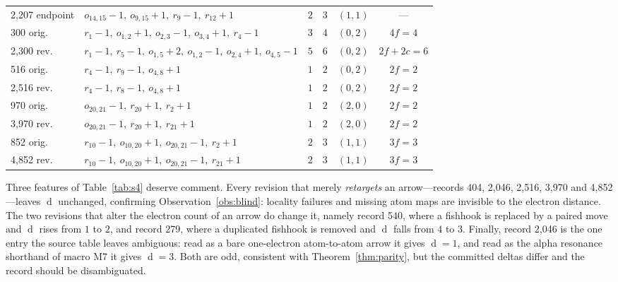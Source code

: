 \documentclass[11pt]{article}
\numberwithin{equation}{section}
\newcommand{\del}{\operatorname{d}}
\theoremstyle{plain}
\theoremstyle{definition}
\theoremstyle{remark}
\begin{document}
\begin{longtable}{@{}l >{\raggedright\arraybackslash}p{6.3cm} c c c c@{}}
2{,}207 endpoint
  & $o_{14,15}{-}1,\ o_{9,15}{+}1,\ r_9{-}1,\ r_{12}{+}1$ & $2$ & $3$ & $(1,1)$ & --- \\
\addlinespace[2pt]
2{,}300 orig.
  & $r_1{-}1,\ o_{1,2}{+}1,\ o_{2,3}{-}1,\ o_{3,4}{+}1,\ r_4{-}1$ & $3$ & $4$ & $(0,2)$ & $4f=4$ \\
2{,}300 rev.
  & $r_1{-}1,\ r_5{-}1,\ o_{1,5}{+}2,\ o_{1,2}{-}1,\ o_{2,4}{+}1,\ o_{4,5}{-}1$
  & $5$ & $6$ & $(0,2)$ & $2f{+}2c=6$ \\
\addlinespace[2pt]
2{,}516 orig.
  & $r_4{-}1,\ r_9{-}1,\ o_{4,8}{+}1$ & $1$ & $2$ & $(0,2)$ & $2f=2$ \\
2{,}516 rev.
  & $r_4{-}1,\ r_8{-}1,\ o_{4,8}{+}1$ & $1$ & $2$ & $(0,2)$ & $2f=2$ \\
\addlinespace[2pt]
3{,}970 orig.
  & $o_{20,21}{-}1,\ r_{20}{+}1,\ r_2{+}1$ & $1$ & $2$ & $(2,0)$ & $2f=2$ \\
3{,}970 rev.
  & $o_{20,21}{-}1,\ r_{20}{+}1,\ r_{21}{+}1$ & $1$ & $2$ & $(2,0)$ & $2f=2$ \\
\addlinespace[2pt]
4{,}852 orig.
  & $r_{10}{-}1,\ o_{10,20}{+}1,\ o_{20,21}{-}1,\ r_2{+}1$ & $2$ & $3$ & $(1,1)$ & $3f=3$ \\
4{,}852 rev.
  & $r_{10}{-}1,\ o_{10,20}{+}1,\ o_{20,21}{-}1,\ r_{21}{+}1$ & $2$ & $3$ & $(1,1)$ & $3f=3$ \\
\end{longtable}
\normalsize
\setlength{\tabcolsep}{6pt}

Three features of Table~\ref{tab:s4} deserve comment.  Every revision that
merely \emph{retargets} an arrow---records 404, 2{,}046, 2{,}516, 3{,}970 and
4{,}852---leaves $\del$ unchanged, confirming
Observation~\ref{obs:blind}: locality failures and missing atom maps are
invisible to the electron distance.  The two revisions that alter the electron
count of an arrow do change it, namely record 540, where a fishhook is replaced
by a paired move and $\del$ rises from $1$ to $2$, and record 279, where a
duplicated fishhook is removed and $\del$ falls from $4$ to $3$.  Finally,
record 2{,}046 is the one entry the source table leaves ambiguous: read as a
bare one-electron atom-to-atom arrow it gives $\del=1$, and read as the alpha
resonance shorthand of macro M7 it gives $\del=3$.  Both are odd, consistent
with Theorem~\ref{thm:parity}, but the committed deltas differ and the record
should be disambiguated.
\end{document}
